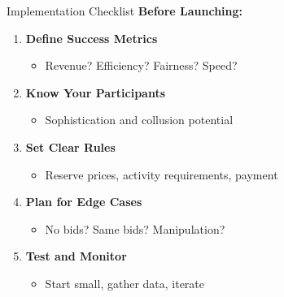 \documentclass[xcolor={x11names}, aspectratio=169 ]{beamer}
\begin{document}
\begin{frame}{Implementation Checklist}
\textbf{Before Launching:}

\begin{enumerate}
  \item \textbf{Define Success Metrics}
  \begin{itemize}
    \item Revenue? Efficiency? Fairness? Speed?
  \end{itemize}
  
  \item \textbf{Know Your Participants}
  \begin{itemize}
    \item Sophistication and collusion potential
  \end{itemize}
  
  \item \textbf{Set Clear Rules}
  \begin{itemize}
    \item Reserve prices, activity requirements, payment
  \end{itemize}
  
  \item \textbf{Plan for Edge Cases}
  \begin{itemize}
    \item No bids? Same bids? Manipulation?
  \end{itemize}
  
  \item \textbf{Test and Monitor}
  \begin{itemize}
    \item Start small, gather data, iterate
  \end{itemize}
\end{enumerate}
\end{frame}
\end{document}
